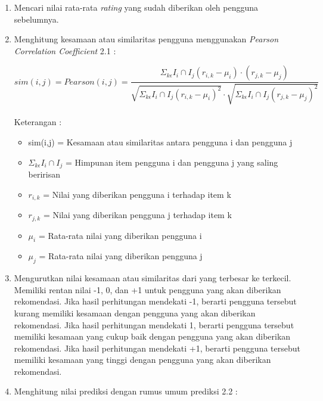 \begin{enumerate}
	\item Mencari nilai rata-rata \textit{rating} yang sudah diberikan oleh pengguna sebelumnya.
	
	\item Menghitung kesamaan atau similaritas pengguna menggunakan \textit{Pearson Correlation Coefficient} 2.1 :
	
	\begin{equation}
		sim(i,j) = Pearson(i,j) = \frac{\Sigma _{k\epsilon} I_{i} \cap I_{j} (r_{i,k}-\mu_{i}) \cdot (r_{j,k}-\mu_{j})}{\sqrt{\Sigma _{k\epsilon} I_{i} \cap I_{j} (r_{i,k}-\mu_{i})^2} \cdot \sqrt{\Sigma _{k\epsilon} I_{i} \cap I_{j} (r_{j,k}-\mu_{j})^2 }}
	\end{equation}\leavevmode \\
	Keterangan : 
	\begin{itemize}
		\item sim(i,j) = Kesamaan atau similaritas antara pengguna i dan pengguna j
		
		\item $\Sigma _{k\epsilon} I_{i} \cap I_{j}$ = Himpunan item pengguna i dan pengguna j yang saling beririsan
		
		\item $r_{i,k}$ = Nilai yang diberikan pengguna i terhadap item k
		
		\item $r_{j,k}$ = Nilai yang diberikan pengguna j terhadap item k
		
		\item $\mu_{i}$ = Rata-rata nilai yang diberikan pengguna i
		
		\item $\mu_{j}$ = Rata-rata nilai yang diberikan pengguna j
	\end{itemize}\leavevmode
	
	\item Mengurutkan nilai kesamaan atau similaritas dari yang terbesar ke terkecil. Memiliki rentan nilai -1, 0, dan +1 untuk pengguna yang akan diberikan rekomendasi. Jika hasil perhitungan mendekati -1, berarti pengguna tersebut kurang memiliki kesamaan dengan pengguna yang akan diberikan rekomendasi. Jika hasil perhitungan mendekati 1, berarti pengguna tersebut memiliki kesamaan yang cukup baik dengan pengguna yang akan diberikan rekomendasi. Jika hasil perhitungan mendekati +1, berarti pengguna tersebut memiliki kesamaan yang tinggi dengan pengguna yang akan diberikan rekomendasi.
	\item Menghitung nilai prediksi dengan rumus umum prediksi 2.2 :
	

\end{enumerate}
